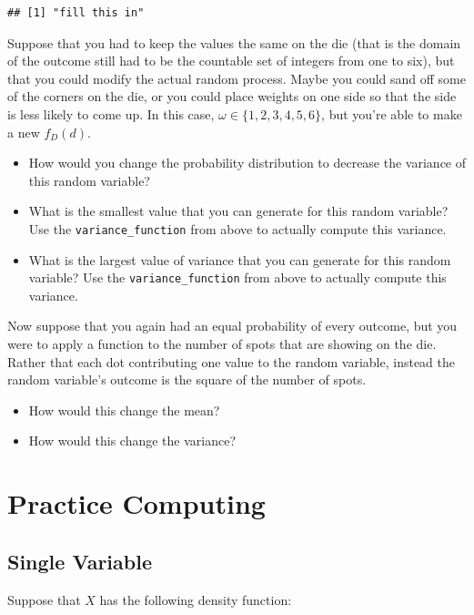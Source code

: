 \documentclass[
]{book}
\providecommand{\tightlist}{%
  \setlength{\itemsep}{0pt}\setlength{\parskip}{0pt}}
\theoremstyle{definition}
\theoremstyle{definition}
\theoremstyle{definition}
\theoremstyle{definition}
\theoremstyle{remark}
\begin{document}
\begin{verbatim}
## [1] "fill this in"
\end{verbatim}

Suppose that you had to keep the values the same on the die (that is the domain of the outcome still had to be the countable set of integers from one to six), but that you could modify the actual random process. Maybe you could sand off some of the corners on the die, or you could place weights on one side so that the side is less likely to come up. In this case, \(\omega \in \{1,2,3,4,5,6\}\), but you're able to make a new \(f_{D}(d)\).

\begin{itemize}
\tightlist
\item
  How would you change the probability distribution to decrease the variance of this random variable?
\item
  What is the smallest value that you can generate for this random variable? Use the \texttt{variance\_function} from above to actually compute this variance.
\item
  What is the largest value of variance that you can generate for this random variable? Use the \texttt{variance\_function} from above to actually compute this variance.
\end{itemize}

Now suppose that you again had an equal probability of every outcome, but you were to apply a function to the number of spots that are showing on the die. Rather that each dot contributing one value to the random variable, instead the random variable's outcome is the square of the number of spots.

\begin{itemize}
\tightlist
\item
  How would this change the mean?
\item
  How would this change the variance?
\end{itemize}

\section{Practice Computing}\label{practice-computing}

\subsection{Single Variable}\label{single-variable}

Suppose that \(X\) has the following density function:
\end{document}
